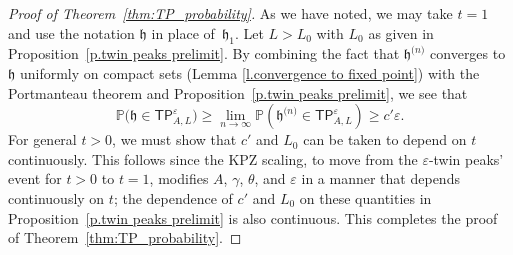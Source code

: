 \documentclass[oneside,final,11pt]{amsart}
\theoremstyle{definition}
\newtheorem{remark}[thm]{Remark}
\newcommand{\fh}{\mathfrak{h}}
\newcommand{\h}{\fh^{{\scriptscriptstyle(}n{\scriptscriptstyle)}}}
\newcommand{\TP}[1]{\mathsf{TP}_{\!\!#1}}
\newcommand{\R}{\mathbb{R}}
\newcommand{\1}[1]{\mathbf{1}_{#1}}
\newcommand{\eps}{\varepsilon}
\newcommand{\hlim}{\mathfrak{h}}
\newcommand{\smallconst}{c'}
\newcommand{\Max}{\mathrm{Max}}
\renewcommand{\P}{\mathbb P}
\numberwithin{equation}{section}
\begin{document}
\begin{proof}[Proof of Theorem~\ref{thm:TP_probability}]
As we have noted, we may take $t=1$ and use the notation $\hlim$ in place of~$\fh_1$. %
%
%
%
%
%
%
Let $L>L_0$ with $L_0$ as given in Proposition~\ref{p.twin peaks prelimit}. By combining the fact that $\h$ converges to $\hlim$ uniformly on compact sets (Lemma \ref{l.convergence to fixed point}) with the Portmanteau theorem and Proposition~\ref{p.twin peaks prelimit}, we see that
%
$$\P\big(\hlim\in\TP{A,L}^{\eps}\big) \geq \lim_{n\to\infty}\P\left(\h\in\TP{A,L}^{\eps}\right) \geq \smallconst\varepsilon.$$
%
For general $t>0$, we must show that $\smallconst$ and $L_0$ can be taken to depend on $t$ continuously. This follows since the KPZ scaling, to move from the $\varepsilon$-twin peaks' event for $t>0$  to $t=1$, modifies $A$, $\gamma$, $\theta$, and $\varepsilon$ in a manner that depends continuously on $t$; the dependence of $\smallconst$ and $L_0$ on these quantities in Proposition~\ref{p.twin peaks prelimit} is also continuous.
This completes the proof of Theorem~\ref{thm:TP_probability}.
\end{proof}

\end{document}

